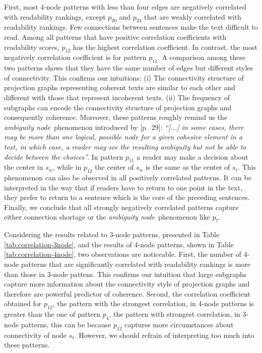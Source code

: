 First, 
most 4-node patterns with less than four edges are negatively correlated with readability rankings, except $p_{20}$ and $p_{24}$ that are weakly correlated with readability rankings. 
Few connections between sentences make the text difficult to read.
Among all patterns that have positive correlation coefficients with readability scores, $p_{12}$ has the highest correlation coefficient. 
In contrast, the most negatively correlation coefficient is for pattern $p_{11}$. 
A comparison among these two patterns shows that they have the same number of edges but different styles of connectivity.
This confirms our intuitions: (i) The connectivity structure of projection graphs representing coherent texts are similar to each other and different with those that represent incoherent texts. 
(ii) The frequency of subgraphs can encode the connectivity structure of projection graphs and consequently coherence. 
Moreover, these patterns roughly remind us the \emph{ambiguity node}\ phenomenon introduced by  [p.\ 29]: 
\emph{
	``[...] in some cases, there may be more
	than one logical, possible node for a given cohesive element in a text, in which case, a reader may see the resulting ambiguity but not be able to decide between the choices''.
	}
In pattern $p_{11}$ a reader may make a decision about the center in $s_w$, while in $p_{12}$ the center of $s_w$ is the same as the center of $s_t$. 
This phenomenon can also be observed in all positively correlated patterns.  
It can be interpreted in the way that if readers have to return to one point in the text, they prefer to return to a sentence which is the core of the preceding sentences.
Finally, we conclude that all strongly negatively correlated patterns capture either connection shortage or the \textit{ambiguity node}\ phenomenon like $p_7$.

Considering the results related to 3-node patterns, presented in Table \ref{tab:correlation-3node}, and the results of 4-node patterns, shown in Table \ref{tab:correlation-4node}, two observations are noticeable.
First, the number of 4-node patterns that are significantly correlated with readability rankings is more than those in 3-node pattens. 
This confirms our intuition that large subgraphs capture more information about the connectivity style of projection graphs and therefore are powerful predictor of coherence.  
Second, the correlation coefficient obtained for $p_{12}$, the pattern with the strongest correlation, in 4-node patterns is greater than the one of pattern $p_4$, the pattern with strongest correlation, in 3-node patterns, this can be because $p_{12}$ captures more circumstances about connectivity of node $s_t$. 
However, we should refrain of interpreting too much into these patterns. 

